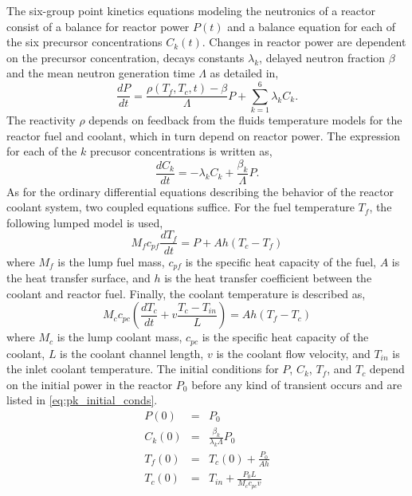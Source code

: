 The six-group point kinetics equations modeling the neutronics of a reactor consist of a balance for reactor power $P(t)$ and a balance equation for each of the six precursor concentrations $C_k(t)$. Changes in reactor power are dependent on the precursor concentration, decays constants $\lambda_k$, delayed neutron fraction $\beta$ and the mean neutron generation time $\Lambda$ as detailed in,
\begin{equation}
\label{eq:pk_power}
   \frac{dP}{dt} = \frac{\rho(T_f,T_c,t)-\beta}{\Lambda}P +
    \sum_{k=1}^6 \lambda_k C_k.
\end{equation}  
The reactivity $\rho$ depends on feedback from the fluids temperature models for the reactor fuel and coolant, which in turn depend on reactor power. The expression for each of the $k$ precusor concentrations is written as,
\begin{equation}
\label{eq:pk_precursors}
   \frac{dC_k}{dt} = -\lambda_k C_k +
    \frac{\beta_k}{\Lambda}P.
\end{equation}
As for the ordinary differential equations describing the behavior of the reactor coolant system, two coupled equations suffice. For the fuel temperature $T_f$, the following lumped model is used,
\begin{equation}
\label{eq:pk_fuel}
   M_f c_{pf}\frac{dT_f}{dt} = P + Ah(T_c-T_f)
\end{equation}
where $M_f$ is the lump fuel mass, $c_{pf}$ is the specific heat capacity of the fuel, $A$ is the heat transfer surface, and $h$ is the heat transfer coefficient between the coolant and reactor fuel. Finally, the coolant temperature is described as,
\begin{equation}
\label{eq:pk_coolant}
   M_c c_{pc}\left(\frac{dT_c}{dt} +v \frac{T_c - T_{in}}{L}\right) = 
    Ah(T_f-T_c)
\end{equation}
where $M_c$ is the lump coolant mass, $c_{pc}$ is the specific heat capacity of the coolant, $L$ is the coolant channel length, $v$ is the coolant flow velocity, and $T_{in}$ is the inlet coolant temperature. The initial conditions for $P$, $C_k$, $T_f$, and $T_c$ depend on the initial power in the reactor $P_0$ before any kind of transient occurs and are listed in \ref{eq:pk_initial_conds}. 
\begin{eqnarray}
\label{eq:pk_initial_conds}
   P(0) &=& P_0 \\ 
   C_k(0) &=& \frac{\beta_k}{\lambda_k\Lambda}P_0 \nonumber \\
   T_f(0) &=& T_c(0) + \frac{P_0}{Ah} \nonumber \\
   T_c(0) &=& T_{in} + \frac{P_0L}{M_c c_{pc}v} \nonumber
\end{eqnarray}
